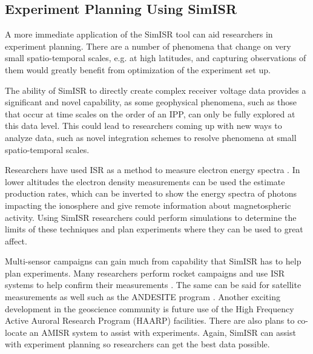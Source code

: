 \subsection{Experiment Planning Using SimISR}

A more immediate application of the SimISR tool can aid researchers in experiment planning. There are a number of phenomena that change on very small spatio-temporal scales, e.g. at high latitudes, and capturing observations of them would greatly benefit from optimization of the experiment set up. 

The ability of SimISR to directly create complex receiver voltage data provides a significant and novel capability, as some geophysical phenomena, such as those that occur at time scales on the order of an IPP, can only be fully explored at this data level. This could lead to researchers coming up with new ways to analyze data, such as novel integration schemes to resolve phenomena at small spatio-temporal scales.

Researchers have used ISR as a method to measure electron energy spectra \cite{Semeter:2005foa}. In lower altitudes the electron density measurements can be used the estimate production rates, which can be inverted to show the energy spectra of photons impacting the ionosphere and give remote information about magnetospheric activity. Using SimISR researchers could perform simulations to determine the limits of these techniques and plan experiments where they can be used to great affect.

Multi-sensor campaigns can gain much from capability that SimISR has to help plan experiments. Many researchers perform rocket campaigns and use ISR systems to help confirm their measurements \cite{JGRA:JGRA50924}. The same can be said for satellite measurements as well such as the ANDESITE program \cite{parham2016multi}. Another exciting development in the geoscience community is future use of the High Frequency Active Auroral Research Program (HAARP) facilities. There are also plans to co-locate an AMISR system to assist with experiments. Again, SimISR can assist with experiment planning so researchers can get the best data possible. 


